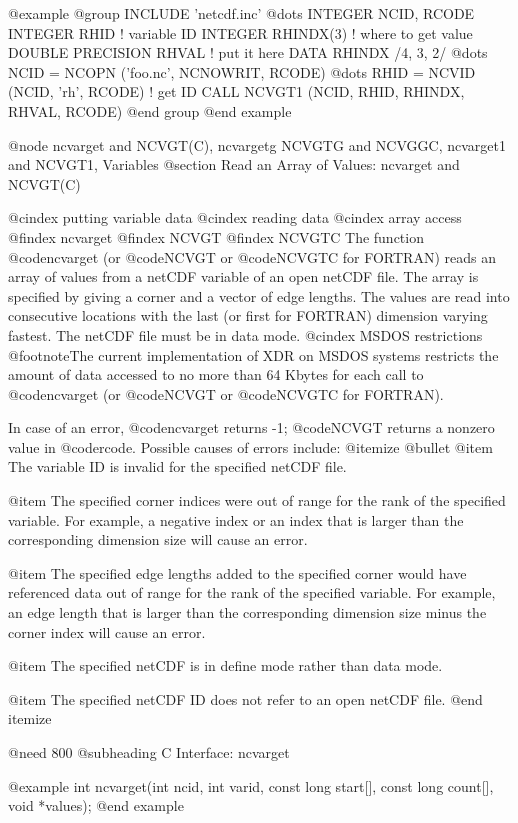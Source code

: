 @example
@group
      INCLUDE 'netcdf.inc'
         @dots{}
      INTEGER NCID, RCODE
      INTEGER RHID ! variable ID
      INTEGER RHINDX(3) ! where to get value
      DOUBLE PRECISION RHVAL ! put it here
      DATA RHINDX /4, 3, 2/
         @dots{}
      NCID = NCOPN ('foo.nc', NCNOWRIT, RCODE)
         @dots{}
      RHID = NCVID (NCID, 'rh', RCODE)   ! get ID
      CALL NCVGT1 (NCID, RHID, RHINDX, RHVAL, RCODE)
@end group
@end example

@node ncvarget and NCVGT(C), ncvargetg NCVGTG and NCVGGC, ncvarget1 and NCVGT1, Variables
@section Read an Array of Values:  ncvarget and NCVGT(C)

@cindex putting variable data
@cindex reading data
@cindex array access
@findex ncvarget
@findex NCVGT
@findex NCVGTC
The function @code{ncvarget} (or @code{NCVGT} or @code{NCVGTC} for
FORTRAN) reads an array of values from a netCDF variable of an open
netCDF file.  The array is specified by giving a corner and a vector
of edge lengths.  The values are read into consecutive locations with
the last (or first for FORTRAN) dimension varying
fastest.  The netCDF file must be in data mode.
@cindex MSDOS restrictions
@footnote{The current implementation of XDR on MSDOS systems restricts
the amount of data accessed to no more than 64 Kbytes for each call
to @code{ncvarget} (or @code{NCVGT} or @code{NCVGTC} for FORTRAN).}

In case of an error, @code{ncvarget} returns -1; @code{NCVGT} returns a
nonzero value in @code{rcode}.  Possible causes of errors include:
@itemize @bullet
@item
The variable ID is invalid for the specified netCDF file.

@item
The specified corner indices were out of range for the rank of
the specified variable.  For example, a negative index or an index that
is larger than the corresponding dimension size will cause an error.

@item
The specified edge lengths added to the specified corner would have
referenced data out of range for the rank of the specified
variable.  For example, an edge length that is larger than the
corresponding dimension size minus the corner index will cause an error.

@item
The specified netCDF is in define mode rather than data mode.

@item
The specified netCDF ID does not refer to an open netCDF file.
@end itemize

@need 800
@subheading C Interface:  ncvarget

@example
int ncvarget(int ncid, int varid, const long start[], const long count[],
             void *values);
@end example

